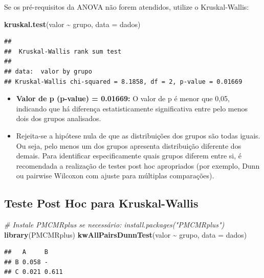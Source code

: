 \documentclass[
]{book}
\newenvironment{Shaded}{\begin{snugshade}}{\end{snugshade}}
\newcommand{\AttributeTok}[1]{\textcolor[rgb]{0.13,0.29,0.53}{#1}}
\newcommand{\CommentTok}[1]{\textcolor[rgb]{0.56,0.35,0.01}{\textit{#1}}}
\newcommand{\FunctionTok}[1]{\textcolor[rgb]{0.13,0.29,0.53}{\textbf{#1}}}
\newcommand{\NormalTok}[1]{#1}
\newcommand{\SpecialCharTok}[1]{\textcolor[rgb]{0.81,0.36,0.00}{\textbf{#1}}}
\begin{document}
Se os pré-requisitos da ANOVA não forem atendidos, utilize o Kruskal-Wallis:

\begin{Shaded}
\begin{Highlighting}[]
\FunctionTok{kruskal.test}\NormalTok{(valor }\SpecialCharTok{\textasciitilde{}}\NormalTok{ grupo, }\AttributeTok{data =}\NormalTok{ dados)}
\end{Highlighting}
\end{Shaded}

\begin{verbatim}
## 
##  Kruskal-Wallis rank sum test
## 
## data:  valor by grupo
## Kruskal-Wallis chi-squared = 8.1858, df = 2, p-value = 0.01669
\end{verbatim}

\begin{itemize}
\item
  \textbf{Valor de p (p-value) = 0.01669:} O valor de p é menor que 0,05, indicando que há diferença estatisticamente significativa entre pelo menos dois dos grupos analisados.
\item
  Rejeita-se a hipótese nula de que as distribuições dos grupos são todas iguais. Ou seja, pelo menos um dos grupos apresenta distribuição diferente dos demais. Para identificar especificamente quais grupos diferem entre si, é recomendada a realização de testes post hoc apropriados (por exemplo, Dunn ou pairwise Wilcoxon com ajuste para múltiplas comparações).
\end{itemize}

\subsection{Teste Post Hoc para Kruskal-Wallis}\label{teste-post-hoc-para-kruskal-wallis}

\begin{Shaded}
\begin{Highlighting}[]
\CommentTok{\# Instale PMCMRplus se necessário: install.packages("PMCMRplus")}
\FunctionTok{library}\NormalTok{(PMCMRplus)}
\FunctionTok{kwAllPairsDunnTest}\NormalTok{(valor }\SpecialCharTok{\textasciitilde{}}\NormalTok{ grupo, }\AttributeTok{data =}\NormalTok{ dados)}
\end{Highlighting}
\end{Shaded}

\begin{verbatim}
##   A     B    
## B 0.058 -    
## C 0.021 0.611
\end{verbatim}
\end{document}
